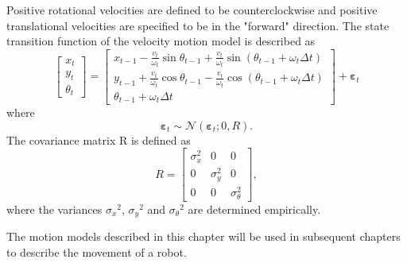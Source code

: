 \documentclass[12pt,oneside,openany,a4paper, %
afrikaans,english,
]{memoir}
\numberwithin{equation}{chapter}
\begin{document}
{Positive rotational velocities are defined to be counterclockwise and positive translational velocities are specified to be in the "forward" direction.
The state transition function of the velocity motion model is described as
\begin{equation}
\begin{bmatrix}
x_t\\
y_t\\
\theta_t
\end{bmatrix}
=
\begin{bmatrix}
x_{t-1} - \frac{v_t}{\omega_t} \sin\theta_{t-1} + \frac{v_t}{\omega_t} \sin(\theta_{t-1} + \omega_t \Delta t)\\
y_{t-1} + \frac{v_t}{\omega_t} \cos\theta_{t-1} - \frac{v_t}{\omega_t} \cos(\theta_{t-1} + \omega_t \Delta t)\\
\theta_{t-1} + \omega_t \Delta t
\end{bmatrix}+
\bm{\varepsilon}_t
\end{equation}
where
\begin{equation}
\bm{\varepsilon}_t \sim \mathcal{N}(\bm{\varepsilon}_t; 0, R).
\end{equation}
The covariance matrix R is defined as
\begin{equation}
R = 
\begin{bmatrix}
\sigma_x^2 & 0 & 0\\
0 & \sigma_y^2 & 0\\
0 & 0 & \sigma_{\theta}^2
\end{bmatrix},
\end{equation}
where the variances ${\sigma_x}^2$, ${\sigma_y}^2$ and ${\sigma_\theta}^2$ are determined empirically.

The motion models described in this chapter will be used in subsequent chapters to describe the movement of a robot.
}
\end{document}
